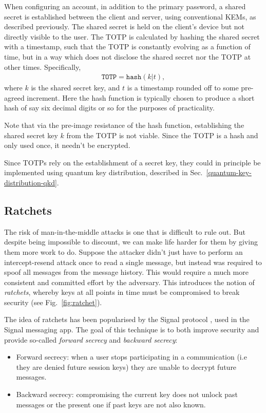 When configuring an account, in addition to the primary password, a shared secret is established between the client and server, using conventional KEMs, as described previously. The shared secret is held on the client's device but not directly visible to the user. The TOTP is calculated by hashing the shared secret with a timestamp, such that the TOTP is constantly evolving as a function of time, but in a way which does not disclose the shared secret nor the TOTP at other times. Specifically,
\begin{align}
\mathtt{TOTP} = \mathtt{hash}(k|t),	
\end{align}
where $k$ is the shared secret key, and $t$ is a timestamp rounded off to some pre-agreed increment. Here the hash function is typically chosen to produce a short hash of say six decimal digits or so for the purposes of practicality.

Note that via the pre-image resistance of the hash function, establishing the shared secret key $k$ from the TOTP is not viable. Since the TOTP is a hash and only used once, it needn't be encrypted.

Since TOTPs rely on the establishment of a secret key, they could in principle be implemented using quantum key distribution, described in Sec.~\ref{quantum-key-distribution-qkd}.

\subsection{Ratchets} \label{ratchets}

The risk of man-in-the-middle attacks is one that is difficult to rule out. But despite being impossible to discount, we can make life harder for them by giving them more work to do. Suppose the attacker didn't just have to perform an intercept-resend attack once to read a single message, but instead was required to spoof all messages from the message history. This would require a much more consistent and committed effort by the adversary. This introduces the notion of \emph{ratchets}, whereby keys at all points in time must be compromised to break security (see Fig.~\ref{fig:ratchet}).

The idea of ratchets has been popularised by the Signal protocol \cite{bib:SignalProtocol}, used in the Signal messaging app. The goal of this technique is to both improve security and provide so-called \emph{forward secrecy} and \emph{backward secrecy}:
\begin{itemize}	
	\item Forward secrecy: when a user stops participating in a communication (i.e they are denied future session keys) they are unable to decrypt future messages.
	\item Backward secrecy: compromising the current key does not unlock past messages or the present one if past keys are not also known.
\end{itemize}

